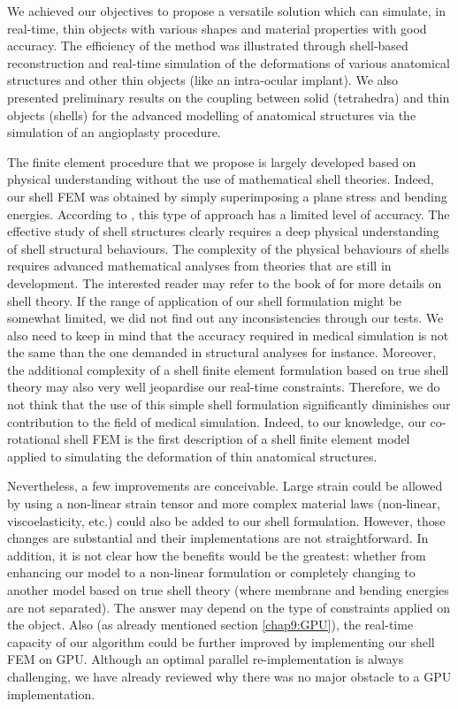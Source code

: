 We achieved our objectives to propose a versatile solution which can simulate, in real-time, thin objects with various shapes and material properties with good accuracy. The efficiency of the method was illustrated through shell-based reconstruction and real-time simulation of the deformations of various anatomical structures and other thin objects (like an intra-ocular implant). We also presented preliminary results on the coupling between solid (tetrahedra) and thin objects (shells) for the advanced modelling of anatomical structures via the simulation of an angioplasty procedure. 

\bigskip

The finite element procedure that we propose is largely developed based on physical understanding without the use of mathematical shell theories. Indeed, our shell FEM was obtained by simply superimposing a plane stress and bending energies. According to \cite{Chapelle03}, this type of approach has a limited level of accuracy. The effective study of shell structures clearly requires a deep physical understanding of shell structural behaviours. The complexity of the physical behaviours of shells requires advanced mathematical analyses from theories that are still in development. The interested reader may refer to the book of \cite{Chapelle03} for more details on shell theory. If the range of application of our shell formulation might be somewhat limited, we did not find out any inconsistencies through our tests. We also need to keep in mind that the accuracy required in medical simulation is not the same than the one demanded in structural analyses for instance. Moreover, the additional complexity of a shell finite element formulation based on true shell theory may also very well jeopardise our real-time constraints. Therefore, we do not think that the use of this simple shell formulation significantly diminishes our contribution to the field of medical simulation. Indeed, to our knowledge, our co-rotational shell FEM is the first description of a shell finite element model applied to simulating the deformation of thin anatomical structures. 

Nevertheless, a few improvements are conceivable. Large strain could be allowed by using a non-linear strain tensor and more complex material laws (non-linear, viscoelasticity, etc.) could also be added to our shell formulation. However, those changes are substantial and their implementations are not straightforward. In addition, it is not clear how the benefits would be the greatest: whether from enhancing our model to a non-linear formulation or completely changing to another model based on true shell theory (where membrane and bending energies are not separated). The answer may depend on the type of constraints applied on the object. Also (as already mentioned section \ref{chap9:GPU}), the real-time capacity of our algorithm could be further improved by implementing our shell FEM on GPU. Although an optimal parallel re-implementation is always challenging, we have already reviewed why there was no major obstacle to a GPU implementation. 

